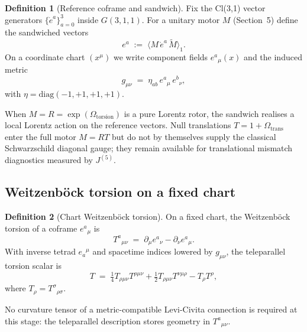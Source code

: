 \documentclass[dvipdfmx,a4paper]{article}
\theoremstyle{definition}
\newtheorem{definition}{Definition}
\theoremstyle{plain}
\theoremstyle{remark}
\begin{document}
\begin{definition}[Reference coframe and sandwich]
Fix the Cl(3,1) vector generators \(\{\mathring{e}^{a}\}_{a=0}^{3}\) inside \(G(3,1,1)\). For a unitary motor \(M\) (Section~5) define the sandwiched vectors
\begin{equation}
e^{a} \;:=\; \bigl\langle M\,\mathring{e}^{a}\,\widetilde{M}\bigr\rangle_{1}.
\label{eq:motor-tetrad}
\end{equation}
On a coordinate chart \((x^{\mu})\) we write component fields \(e^{a}{}_{\mu}(x)\) and the induced metric
\begin{equation}
g_{\mu\nu} \;=\; \eta_{ab}\, e^{a}{}_{\mu}\, e^{b}{}_{\nu},
\label{eq:induced-metric}
\end{equation}
with \(\eta=\mathrm{diag}(-1,+1,+1,+1)\).
\end{definition}

When \(M=R=\exp(\Omega_{\mathrm{torsion}})\) is a pure Lorentz rotor, the sandwich realises a local Lorentz action on the reference vectors. Null translations \(T=1+\Omega_{\mathrm{trans}}\) enter the full motor \(M=RT\) but do not by themselves supply the classical Schwarzschild diagonal gauge; they remain available for translational mismatch diagnostics measured by \(J^{(5)}\).

\subsection{Weitzenb\"{o}ck torsion on a fixed chart}

\begin{definition}[Chart Weitzenb\"{o}ck torsion]
On a fixed chart, the Weitzenb\"{o}ck torsion of a coframe \(e^{a}{}_{\mu}\) is
\begin{equation}
T^{a}{}_{\mu\nu} \;=\; \partial_{\mu} e^{a}{}_{\nu} - \partial_{\nu} e^{a}{}_{\mu}.
\label{eq:weitzenbock-torsion}
\end{equation}
With inverse tetrad \(e_{a}{}^{\mu}\) and spacetime indices lowered by \(g_{\mu\nu}\), the teleparallel torsion scalar is
\begin{equation}
T \;=\; \tfrac14 T_{\rho\mu\nu}T^{\rho\mu\nu} + \tfrac12 T_{\rho\mu\nu}T^{\nu\mu\rho} - T_{\rho}T^{\rho},
\label{eq:teleparallel-T}
\end{equation}
where \(T_{\rho}=T^{\sigma}{}_{\rho\sigma}\).
\end{definition}

No curvature tensor of a metric-compatible Levi-Civita connection is required at this stage: the teleparallel description stores geometry in \(T^{a}{}_{\mu\nu}\).
\end{document}
